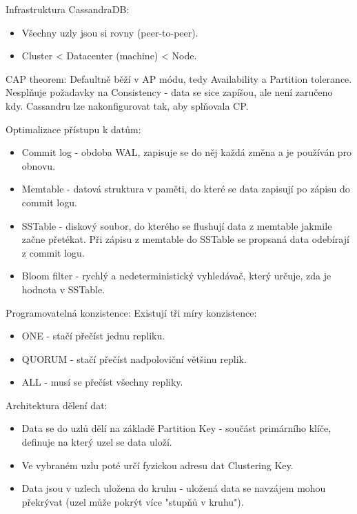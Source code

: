 Infrastruktura CassandraDB:
\begin{itemize}
  \item Všechny uzly jsou si rovny (peer-to-peer).
  \item Cluster < Datacenter (machine) < Node.
\end{itemize}

CAP theorem:
Defaultně běží v AP módu, tedy Availability a Partition tolerance. Nesplňuje požadavky na Consistency - data se sice zapíšou, ale není zaručeno kdy. Cassandru lze nakonfigurovat tak, aby splňovala CP.

Optimalizace přístupu k datům:
\begin{itemize}
  \item Commit log - obdoba WAL, zapisuje se do něj každá změna a je používán pro obnovu.
  \item Memtable - datová struktura v paměti, do které se data zapisují po zápisu do commit logu.
  \item SSTable - diskový soubor, do kterého se flushují data z memtable jakmile začne přetékat. Při zápisu z memtable do SSTable se propsaná data odebírají z commit logu.
  \item Bloom filter - rychlý a nedeterministický vyhledávač, který určuje, zda je hodnota v SSTable.
\end{itemize}

Programovatelná konzistence:
Existují tři míry konzistence:
\begin{itemize}
  \item ONE - stačí přečíst jednu repliku. 
  \item QUORUM - stačí přečíst nadpoloviční většinu replik.
  \item ALL - musí se přečíst všechny repliky.
\end{itemize}

Architektura dělení dat:
\begin{itemize}
  \item Data se do uzlů dělí na základě Partition Key - součást primárního klíče, definuje na který uzel se data uloží.
  \item Ve vybraném uzlu poté určí fyzickou adresu dat Clustering Key.
  \item Data jsou v uzlech uložena do kruhu - uložená data se navzájem mohou překrývat (uzel může pokrýt více "stupňů v kruhu").
\end{itemize}
